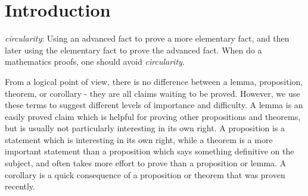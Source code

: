 \chapter{Introduction}\label{i:ch:1}

\begin{note}
  \emph{circularity}:
  Using an advanced fact to prove a more elementary fact, and then later using the elementary fact to prove the advanced fact.
  When do a mathematics proofs, one should avoid \emph{circularity}.
\end{note}

\begin{note}
  From a logical point of view, there is no difference between a lemma, proposition, theorem, or corollary
  - they are all claims waiting to be proved.
  However, we use these terms to suggest different levels of importance and difficulty.
  A lemma is an easily proved claim which is helpful for proving other propositions and theorems, but is usually not particularly interesting in its own right.
  A proposition is a statement which is interesting in its own right, while a theorem is a more important statement than a proposition which says something definitive on the subject, and often takes more effort to prove than a proposition or lemma.
  A corollary is a quick consequence of a proposition or theorem that was proven recently.
\end{note}
